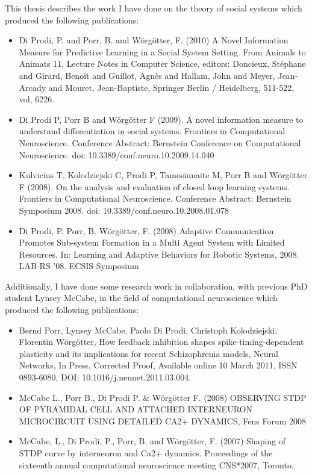 
This thesis describes the work I have done on the theory of social systems
which produced the following publications:
\begin{itemize}
\item Di Prodi, P. and Porr, B. and W\"{o}rg\"{o}tter, F. (2010) A Novel Information
Measure for Predictive Learning in a Social System Setting. From Animals to
Animats 11, Lecture Notes in Computer Science, editors: Doncieux, Stéphane and
Girard, Benoît and Guillot, Agnès and Hallam, John and Meyer, Jean-Arcady and
Mouret, Jean-Baptiste, Springer Berlin / Heidelberg, 511-522, vol, 6226.

\item Di Prodi P, Porr B and W\"{o}rg\"{o}tter F (2009). A novel information measure to
understand differentiation in social systems. Frontiers in Computational
Neuroscience. Conference Abstract: Bernstein Conference on Computational
Neuroscience. doi: 10.3389/conf.neuro.10.2009.14.040

\item Kulvicius T, Kolodziejski C, Prodi P, Tamosiunaite M, Porr B and
W\"{o}rg\"{o}tter F (2008). On the analysis and evaluation of closed loop learning
systems. Frontiers in Computational Neuroscience. Conference Abstract: Bernstein
Symposium 2008. doi: 10.3389/conf.neuro.10.2008.01.078

\item Di Prodi, P. Porr, B. W\"{o}rg\"{o}tter, F. (2008) Adaptive Communication
Promotes Sub-system Formation in a Multi Agent System with Limited Resources.
In: Learning and Adaptive Behaviors for Robotic Systems, 2008. LAB-RS '08. ECSIS
Symposium
\end{itemize}

Additionally, I have done some research work in collaboration, with previous PhD
student Lynsey McCabe, in the field of computational neuroscience which produced
the following publications:
\begin{itemize}
\item Bernd Porr, Lynsey McCabe, Paolo Di Prodi, Christoph Kolodziejski,
Florentin W\"{o}rg\"{o}tter, How feedback inhibition shapes spike-timing-dependent
plasticity and its implications for recent Schizophrenia models, Neural
Networks, In Press, Corrected Proof, Available online 10 March 2011, ISSN
0893-6080, DOI: 10.1016/j.neunet.2011.03.004.

\item McCabe L., Porr B., Di Prodi P. \& W\"{o}rg\"{o}tter F. (2008) OBSERVING STDP
OF PYRAMIDAL CELL AND ATTACHED INTERNEURON MICROCIRCUIT USING DETAILED CA2+
DYNAMICS, Fens Forum 2008

\item McCabe, L., Di Prodi, P., Porr, B. and W\"{o}rg\"{o}tter, F. (2007) Shaping of
STDP curve by interneuron and Ca2+ dynamics. Proceedings of the sixteenth annual
computational neuroscience meeting CNS*2007, Toronto.
\end{itemize}

